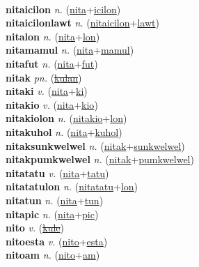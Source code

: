  \label{nitaec} \\
\textbf{nitaicilon} \textit{n.} (\hyperref[nita]{nita}+\hyperref[icilon]{icilon})
 \label{nitaicilon} \\
\textbf{nitaicilonlawt} \textit{n.} (\hyperref[nitaicilon]{nitaicilon}+\hyperref[lawt]{lawt})
 \label{nitaicilonlawt} \\
\textbf{nitalon} \textit{n.} (\hyperref[nita]{nita}+\hyperref[lon]{lon})
 \label{nitalon} \\
\textbf{nitamamul} \textit{n.} (\hyperref[nita]{nita}+\hyperref[mamul]{mamul})
 \label{nitamamul} \\
\textbf{nitafut} \textit{n.} (\hyperref[nita]{nita}+\hyperref[fut]{fut})
 \label{nitafut} \\
\textbf{nitak} \textit{pn.} (\hyperref[kulan]{\sout{kulan}})
 \label{nitak} \\
\textbf{nitaki} \textit{v.} (\hyperref[nita]{nita}+\hyperref[ki]{ki})
 \label{nitaki} \\
\textbf{nitakio} \textit{v.} (\hyperref[nita]{nita}+\hyperref[kio]{kio})
 \label{nitakio} \\
\textbf{nitakiolon} \textit{n.} (\hyperref[nitakio]{nitakio}+\hyperref[lon]{lon})
 \label{nitakiolon} \\
\textbf{nitakuhol} \textit{n.} (\hyperref[nita]{nita}+\hyperref[kuhol]{kuhol})
 \label{nitakuhol} \\
\textbf{nitaksunkwelwel} \textit{n.} (\hyperref[nitak]{nitak}+\hyperref[sunkwelwel]{sunkwelwel})
 \label{nitaksunkwelwel} \\
\textbf{nitakpumkwelwel} \textit{n.} (\hyperref[nitak]{nitak}+\hyperref[pumkwelwel]{pumkwelwel})
 \label{nitakpumkwelwel} \\
\textbf{nitatatu} \textit{v.} (\hyperref[nita]{nita}+\hyperref[tatu]{tatu})
 \label{nitatatu} \\
\textbf{nitatatulon} \textit{n.} (\hyperref[nitatatu]{nitatatu}+\hyperref[lon]{lon})
 \label{nitatatulon} \\
\textbf{nitatun} \textit{n.} (\hyperref[nita]{nita}+\hyperref[tun]{tun})
 \label{nitatun} \\
\textbf{nitapic} \textit{n.} (\hyperref[nita]{nita}+\hyperref[pic]{pic})
 \label{nitapic} \\
\textbf{nito} \textit{v.} (\hyperref[kule]{\sout{kule}})
 \label{nito} \\
\textbf{nitoesta} \textit{v.} (\hyperref[nito]{nito}+\hyperref[esta]{esta})
 \label{nitoesta} \\
\textbf{nitoam} \textit{n.} (\hyperref[nito]{nito}+\hyperref[am]{am})
